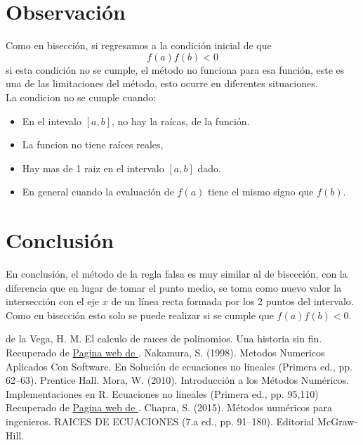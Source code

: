 \documentclass[12pt]{article}
\begin{document}
		\section*{\centering Observación}\label{sec:Observacion}
			Como en bisección, si regresamos a la condición inicial de que $$ f(a)f(b) < 0 $$
			si esta condición no se cumple, el método no funciona para esa función, este es una de las 
			limitaciones del método, esto ocurre en diferentes situaciones.\\
			La condicion no se cumple cuando:
			\begin{itemize}
				\item En el intevalo $ [a,b] $, no hay la raícas, de la función.
				\item La funcion no tiene raíces reales,
				\item Hay mas de 1 raiz en el intervalo $ [a,b] $ dado.
				\item En general cuando la evaluación de $ f(a) $ tiene el mismo signo que $ f(b) $.
			\end{itemize}
		

		\section*{\centering Conclusión}\label{sec:Conclusion}
			En conclusión, el método de la regla falsa es muy similar al de bisección, con la diferencia que en 
			lugar de tomar el punto medio, se toma como nuevo valor la intersección con el eje $ x $ de un línea 
			recta formada por los 2 puntos del intervalo. Como en bisección esto solo se puede realizar si se 
			cumple que $ f(a)f(b) < 0 $.

		\centering
		\begin{thebibliography}{10}
			 de la Vega, H. M. El calculo de raıces de polinomios. Una historia sin fin. Recuperado de
							\href{http://www.matedu.cinvestav.mx/~elcalculoysuensenanza/investigacion/articulosPDF/Madrid.pdf}{Pagina web de \cite{bib:item1}}.
			 Nakamura, S. (1998). Metodos Numericos Aplicados Con Software. En Solución de ecuaciones no lineales (Primera ed., pp. 62–63). Prentice Hall.
			 Mora, W. (2010). Introducción a los Métodos Numéricos. Implementaciones en R. Ecuaciones no lineales (Primera ed., pp. 95,110) Recuperado de
							\href{https://tecdigital.tec.ac.cr/revistamatematica/Libros/WMora_MetodosNumericos/2017_Principal_MetodosNumericos-con-R.pdf}{Pagina web de \cite{bib:item3}}. 
							 Chapra, S. (2015). Métodos numéricos para ingenieros. RAICES DE ECUACIONES (7.a ed., pp. 91–180). Editorial McGraw-Hill.				
			
		\end{thebibliography}

	
\end{document}
